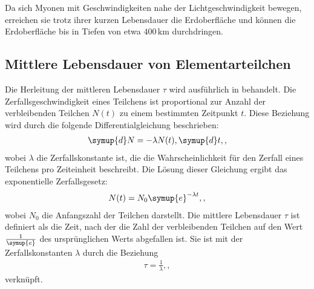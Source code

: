 Da sich Myonen mit Geschwindigkeiten nahe der Lichtgeschwindigkeit bewegen, erreichen sie trotz ihrer kurzen Lebensdauer die Erdoberfläche 
und können die Erdoberfläche bis in Tiefen von etwa $400\,\unit{\kilo\meter}$ durchdringen.

\subsection{Mittlere Lebensdauer von Elementarteilchen}
Die Herleitung der mittleren Lebensdauer $\tau$ wird ausführlich in \cite{Techniques} behandelt. Die Zerfallsgeschwindigkeit eines Teilchens 
ist proportional zur Anzahl der verbleibenden Teilchen $N(t)$ zu einem bestimmten Zeitpunkt $t$. Diese Beziehung wird durch die folgende 
Differentialgleichung beschrieben:
\begin{align}
\symup{d}N = -\lambda N(t),\symup{d}t,, \label{eqn:dN}
\end{align}
wobei $\lambda$ die Zerfallskonstante ist, die die Wahrscheinlichkeit für den Zerfall eines Teilchens pro Zeiteinheit beschreibt. 
Die Lösung dieser Gleichung ergibt das exponentielle Zerfallsgesetz:
\begin{align}
N(t) = N_0 \symup{e}^{-\lambda t},, \label{eqn:Zerfallsgesetz}
\end{align}
wobei $N_0$ die Anfangszahl der Teilchen darstellt. Die mittlere Lebensdauer $\tau$ ist definiert als die Zeit, nach der die Zahl der 
verbleibenden Teilchen auf den Wert $\frac{1}{\symup{e}}$ des ursprünglichen Werts abgefallen ist. Sie ist mit der Zerfallskonstanten $\lambda$ durch die Beziehung
\begin{align}
\tau = \frac{1}{\lambda},, \label{eqn:tau}
\end{align}
verknüpft.
